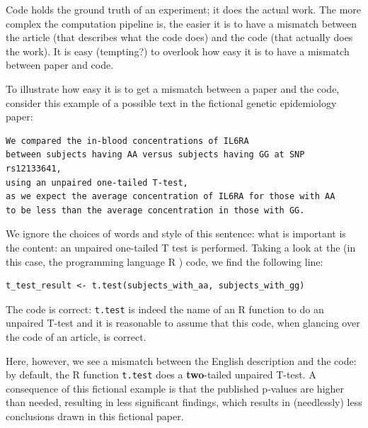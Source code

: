 Code holds the ground truth of an experiment; it does the actual work.
The more complex the computation pipeline is, the easier it is
to have a mismatch between the article (that describes what the
code does) and the code (that actually does the work).
It is easy (tempting?) to overlook how easy it is to have a mismatch
between paper and code.

To illustrate how easy it is to get a mismatch between a paper
and the code, 
consider this example of a possible text in the fictional 
genetic epidemiology paper:

\begin{verbatim}
We compared the in-blood concentrations of IL6RA 
between subjects having AA versus subjects having GG at SNP rs12133641,
using an unpaired one-tailed T-test,
as we expect the average concentration of IL6RA for those with AA 
to be less than the average concentration in those with GG.
\end{verbatim}

We ignore the choices of words and style of this sentence: what is
important is the content: an unpaired one-tailed T test is performed.
Taking a look at the (in this case, the programming language R \cite{r}) code, 
we find the following line:

\begin{verbatim}
t_test_result <- t.test(subjects_with_aa, subjects_with_gg)
\end{verbatim}

The code is correct:
\verb|t.test| is indeed the name of an R function to do an unpaired T-test
and it is reasonable to assume that this code, when glancing over the code
of an article, is correct.

Here, however, we see a mismatch between the English description and the code:
by default, the R function \verb|t.test| does 
a \textbf{two}-tailed unpaired T-test.
A consequence of this fictional example is that the published p-values are
higher than needed, resulting in less significant findings, which
results in (needlessly) less conclusions drawn in this fictional paper.

